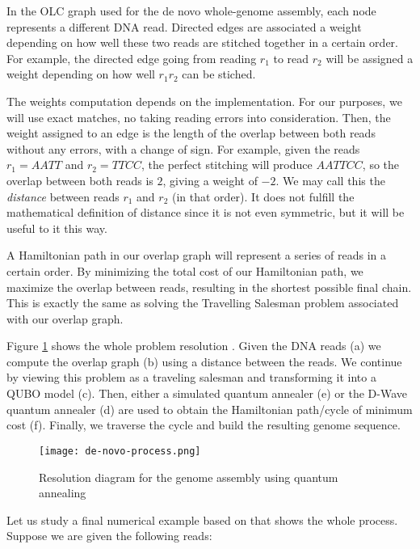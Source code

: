 In the OLC graph used for the de novo whole-genome assembly, each node represents a different DNA read. Directed edges are associated a weight depending on how well these two reads are stitched together in a certain order. For example, the directed edge going from reading $r_1$ to read $r_2$ will be assigned a weight depending on how well $r_1r_2$ can be stiched.

The weights computation depends on the implementation. For our purposes, we will use exact matches, no taking reading errors into consideration. Then, the weight assigned to an edge is the length of the overlap between both reads without any errors, with a change of sign. For example, given the reads $r_1 = AATT$ and $r_2 = TTCC$, the perfect stitching will produce $AATTCC$, so the overlap between both reads is $2$, giving a weight of $-2$. We may call this the \emph{distance} between reads $r_1$ and $r_2$ (in that order). It does not fulfill the mathematical definition of distance since it is not even symmetric, but it will be useful to it this way.

A Hamiltonian path in our overlap graph will represent a series of reads in a certain order. By minimizing the total cost of our Hamiltonian path, we maximize the overlap between reads, resulting in the shortest possible final chain. This is exactly the same as solving the Travelling Salesman problem associated with our overlap graph.

Figure \ref{de-novo-process} shows the whole problem resolution \cite{Boev2020}. Given the DNA reads (a) we compute the overlap graph (b) using a distance between the reads. We continue by viewing this problem as a traveling salesman and transforming it into a QUBO model (c). Then, either a simulated quantum annealer (e) or the D-Wave quantum annealer (d) are used to obtain the Hamiltonian path/cycle of minimum cost (f). Finally, we traverse the cycle and build the resulting genome sequence.

\begin{figure}[H]
	\texttt{[image: de-novo-process.png]}
	\centering
	\caption{Resolution diagram for the genome assembly using quantum annealing \cite{Boev2020}}
	\label{de-novo-process}
\end{figure}




Let us study a final numerical example based on \cite{Sarkar2020} that shows the whole process. Suppose we are given the following reads:

